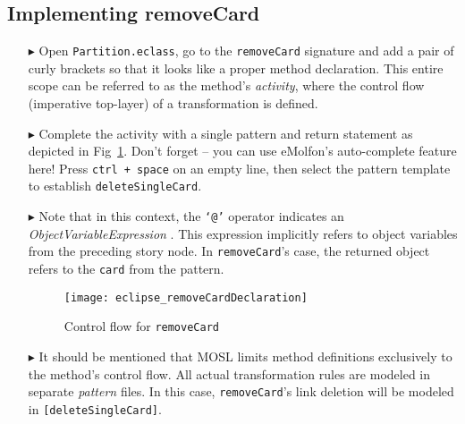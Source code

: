 \newpage
\hypertarget{remCard tex}{}
\subsection{Implementing removeCard}
\texHeader

\begin{itemize}

\item[$\blacktriangleright$] Open \texttt{Partition.eclass}, go to the \texttt{removeCard} signature and add a pair of curly brackets so that it looks like a
proper method declaration. This entire scope can be referred to as the method's \emph{activity}, where the control flow (imperative top-layer) of a
transformation is defined.

\item[$\blacktriangleright$] Complete the activity with a single pattern and return statement as depicted in Fig~\ref{eclipse:remCardDec}. Don't forget -- you
can use eMolfon's auto-complete feature here! Press \texttt{ctrl + space} on an empty line, then select the pattern template to establish \texttt{deleteSingleCard}.

\item[$\blacktriangleright$] Note that in this context, the \texttt{`@'} operator indicates an \emph{ObjectVariableExpression}%
. This expression implicitly refers to object variables from the preceding story node. In \texttt{removeCard}'s case, the
returned object refers to the \texttt{card} from the pattern.

\vspace{0.5cm}

\begin{figure}[htp]
\begin{center}
  \texttt{[image: eclipse\_removeCardDeclaration]}
  \caption{Control flow for \texttt{removeCard}}
  \label{eclipse:remCardDec}
\end{center}
\end{figure}

\item[$\blacktriangleright$] It should be mentioned that MOSL limits method definitions exclusively to the method's control flow. All actual transformation
rules are modeled in separate \emph{pattern} files. In this case, \texttt{removeCard}'s link deletion will be modeled in \texttt{[deleteSingleCard]}.

\vspace{0.5cm}


\end{itemize}
